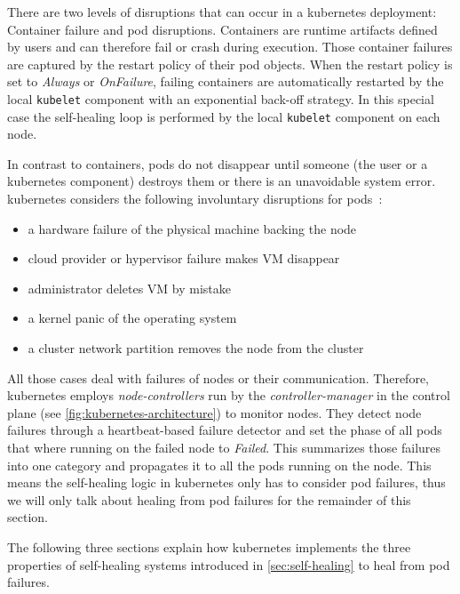   There are two levels of disruptions that can occur in a \gls{kubernetes} deployment: Container failure and pod disruptions.
  Containers are runtime artifacts defined by users and can therefore fail or crash during execution.
  Those container failures are captured by the restart policy of their pod objects.
  When the restart policy is set to \textit{Always} or \textit{OnFailure}, failing containers are automatically restarted by the local \texttt{kubelet} component with an exponential back-off strategy.
  In this special case the self-healing loop is performed by the local \texttt{kubelet} component on each node.

  In contrast to containers, pods do not disappear until someone (the user or a \gls{kubernetes} component) destroys them or there is an unavoidable system error.
  \Gls{kubernetes} considers the following involuntary disruptions for pods~\cite{kubernetes}:

  \begin{itemize}
    \item a hardware failure of the physical machine backing the node
    \item cloud provider or hypervisor failure makes VM disappear
    \item administrator deletes VM by mistake
    \item a kernel panic of the operating system
    \item a cluster network partition removes the node from the cluster
  \end{itemize}

  All those cases deal with failures of nodes or their communication.
  Therefore, \gls{kubernetes} employs \textit{node-controllers} run by the \textit{controller-manager} in the control plane (see \cref{fig:kubernetes-architecture}) to monitor nodes.
  They detect node failures through a heartbeat-based failure detector and set the phase of all pods that where running on the failed node to \textit{Failed}.
  This summarizes those failures into one category and propagates it to all the pods running on the node.
  This means the self-healing logic in \gls{kubernetes} only has to consider pod failures,
  thus we will only talk about healing from pod failures for the remainder of this section.

  The following three sections explain how \gls{kubernetes} implements the three properties of self-healing systems introduced in \cref{sec:self-healing} to heal from pod failures.

